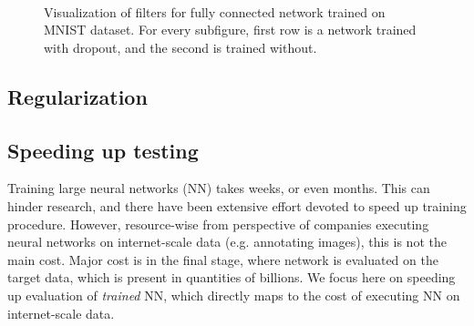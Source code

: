 \documentclass{article}
\begin{document}
\begin{figure}[h]
\centering
  \
  
\caption{Visualization of filters for fully connected network trained on MNIST dataset. For every subfigure, first 
	 row is a network trained with dropout, and the second is trained without.}
\label{filters_mnist}
\end{figure}




\subsection{Regularization}

\subsection{Speeding up testing}
Training large neural networks (NN) takes weeks, or even months. This can hinder 
research, and there have been extensive effort devoted to speed up training procedure.
However, resource-wise from perspective of companies executing neural networks on internet-scale
data (e.g. annotating images), this is not the main cost. Major cost is in the 
final stage, where network is evaluated on the target data, which is present in quantities of billions.
We focus here on speeding up evaluation of \emph{trained} NN, which directly
maps to the cost of executing NN on internet-scale data. 
\end{document}

